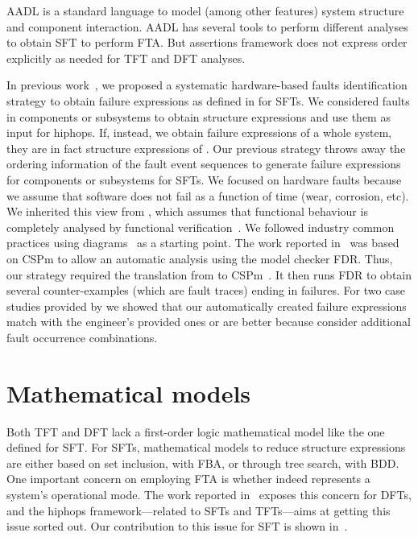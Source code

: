 \Ac{AADL} is a standard language to model (among other features) system structure and component interaction. 
\Ac{AADL} has several tools to perform different analyses to obtain \ac{SFT} to perform \ac{FTA}.
But  assertions framework does not express order explicitly as needed for \ac{TFT} and \ac{DFT} analyses.

In previous work~\cite{Didier2012,DM2012}, we proposed a systematic hardware-based faults identification strategy to obtain failure expressions as defined in  for \acp{SFT}.
%
We considered faults in components or subsystems to obtain structure expressions and use them as input for \ac{hiphops}.
If, instead, we obtain failure expressions of a whole system, they are in fact structure expressions of .
%
Our previous strategy throws away the ordering information of the fault event sequences to generate failure expressions for components or subsystems for \acp{SFT}.
%
%
We focused on hardware faults because we assume that software does not fail as a function of time (wear, corrosion, etc).
%
We inherited this view from \embraer, which assumes that functional behaviour is completely analysed by functional verification~\cite{SP2011}.
%
We followed industry common practices using \simulink diagrams~\cite{Nise1992} as a starting point.
%
The work reported in~\cite{DM2012} was based on \ac{CSPm} to allow an automatic analysis using the model checker \acs{FDR}.
%
Thus, our strategy required the translation from \simulink to \ac{CSPm}~\cite{JMS+2011}.
%
It then runs \acs{FDR} to obtain several counter-examples (which are fault traces) ending in failures.
%
For two case studies provided by \embraer we showed that our automatically created failure expressions match with the engineer's provided ones or are better because consider additional fault occurrence combinations.

\section{Mathematical models}
\label{sec:mathematical-models}

Both \ac{TFT} and \ac{DFT} lack a first-order logic mathematical model like the one defined for \ac{SFT}.
For \acp{SFT}, mathematical models to reduce structure expressions are either based on set inclusion, with \ac{FBA}, or through tree search, with \ac{BDD}.
One important concern on employing \ac{FTA} is whether  indeed represents a system's operational mode.
The work reported in~\cite{MCS+1999} exposes this concern for \acp{DFT}, and the \ac{hiphops} framework---related to \acp{SFT} and \acp{TFT}---aims at getting this issue sorted out.
Our contribution to this issue for \ac{SFT} is shown in~\cite{DM2012,Didier2012}.


